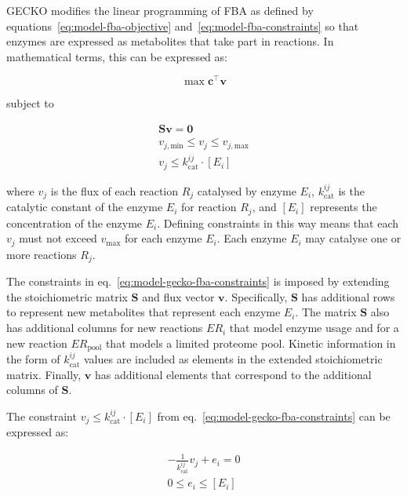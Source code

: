 GECKO modifies the linear programming of FBA as defined by equations~\ref{eq:model-fba-objective} and~\ref{eq:model-fba-constraints} so that enzymes are expressed as metabolites that take part in reactions.
In mathematical terms, this can be expressed as:

\begin{equation}
  \max \mathbf{c}^{\intercal} \mathbf{v}
  \label{eq:model-gecko-fba-objective}
\end{equation}

subject to

\begin{equation}
  \begin{gathered}
    \mathbf{S} \mathbf{v} = \mathbf{0}\\
    v_{j,\mathrm{min}} \leq v_{j} \leq v_{j,\mathrm{max}}\\
    v_{j} \leq k_{\mathrm{cat}}^{ij} \cdot [E_{i}]
  \end{gathered}
  \label{eq:model-gecko-fba-constraints}
\end{equation}

where $v_{j}$ is the flux of each reaction $R_{j}$ catalysed by enzyme $E_{i}$, $k_{\mathrm{cat}}^{ij}$ is the catalytic constant of the enzyme $E_{i}$ for reaction $R_{j}$, and $[E_{i}]$ represents the concentration of the enzyme $E_{i}$.
Defining constraints in this way means that each $v_{j}$ must not exceed $v_{\mathrm{max}}$ for each enzyme $E_{i}$.
Each enzyme $E_{i}$ may catalyse one or more reactions $R_{j}$.

The constraints in eq.\ \ref{eq:model-gecko-fba-constraints} is imposed by extending the stoichiometric matrix $\mathbf{S}$ and flux vector $\mathbf{v}$.
Specifically, $\mathbf{S}$ has additional rows to represent new metabolites that represent each enzyme $E_{i}$.
The matrix $\mathbf{S}$ also has additional columns for new reactions $ER_{i}$ that model enzyme usage and for a new reaction $ER_{\mathrm{pool}}$ that models a limited proteome pool.
Kinetic information in the form of $k_{\mathrm{cat}}^{ij}$ values are included as elements in the extended stoichiometric matrix.
Finally, $\mathbf{v}$ has additional elements that correspond to the additional columns of $\mathbf{S}$.

The constraint $v_{j} \leq k_{\mathrm{cat}}^{ij} \cdot [E_{i}]$ from eq.\ \ref{eq:model-gecko-fba-constraints} can be expressed as:

\begin{equation}
  \begin{gathered}
    -\frac{1}{k_{\mathrm{cat}}^{ij}}v_{j} + e_{i} = 0\\
    0 \leq e_{i} \leq [E_{i}]
  \end{gathered}
  \label{eq:model-gecko-fba-constraints-extended}
\end{equation}

